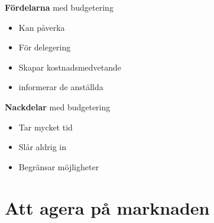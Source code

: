 \begin{multicols}{2}
\textbf{Fördelarna} med budgetering
\begin{itemize}
    \item Kan påverka
    \item För delegering
    \item Skapar kostnadsmedvetande
    \item informerar de anställda
\end{itemize}

\textbf{Nackdelar} med budgetering
\begin{itemize}
    \item Tar mycket tid
    \item Slår aldrig in 
    \item Begränsar möjligheter
\end{itemize}





\section{Att agera på marknaden}

\end{multicols}
